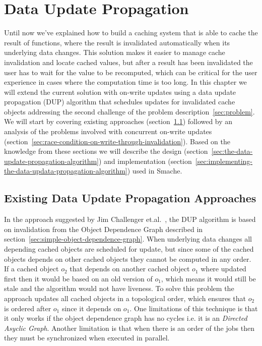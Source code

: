 \chapter{Data Update Propagation}
\label{chapter:data-update-propagation}

Until now we've explained how to build a caching system that is able to cache the result of functions, where the result is invalidated automatically when its underlying data changes. This solution makes it easier to manage cache invalidation and locate cached values, but after a result has been invalidated the user has to wait for the value to be recomputed, which can be critical for the user experience in cases where the computation time is too long.
In this chapter we will extend the current solution with on-write updates using a data update propagation (DUP) algorithm that schedules updates for invalidated cache objects addressing the second challenge of the problem description~\ref{sec:problem}. We will start by covering existing approaches (section~\ref{sec:existing-data-update-propagation-approaches}) followed by an analysis of the problems involved with concurrent on-write updates (section~\ref{sec:race-condition-on-write-through-invalidation}). Based on the knowledge from these sections we will describe the design (section~\ref{sec:the-data-update-propagation-algorithm}) and implementation (section~\ref{sec:implementing-the-data-updata-propagation-algorithm}) used in Smache.

\section{Existing Data Update Propagation Approaches}
\label{sec:existing-data-update-propagation-approaches}

In the approach suggested by Jim Challenger et.al.~\cite{paper:ibm, paper:ibm-extended, paper:ibm-publishing-system}, the DUP algorithm is based on invalidation from the Object Dependence Graph described in section~\ref{sec:simple-object-dependence-graph}. When underlying data changes all depending cached objects are scheduled for update, but since some of the cached objects depends on other cached objects they cannot be computed in any order. If a cached object $o_2$ that depends on another cached object $o_1$ where updated first then it would be based on an old version of $o_1$, which means it would still be stale and the algorithm would not have liveness. To solve this problem the approach updates all cached objects in a topological order, which ensures that $o_2$ is ordered after $o_1$ since it depends on $o_1$. One limitations of this technique is that it only works if the object dependence graph has no cycles i.e. it is an \emph{Directed Asyclic Graph}. Another limitation is that when there is an order of the jobs then they must be synchronized when executed in parallel.

